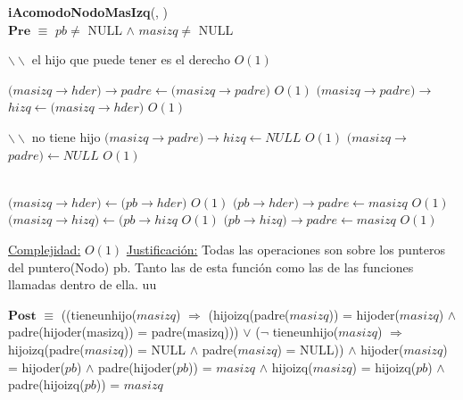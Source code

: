 \begin{algorithm}[H]{\textbf{iAcomodoNodoMasIzq}(, )}
	{\\ $\textbf{Pre}$ $\equiv$ $pb \neq$ NULL $\land$ $masizq \neq$ NULL}
	\begin{algorithmic}[1]

		\State $\backslash\backslash$ el hijo que puede tener es el derecho
		 \Comment $O(1)$

			\State $(masizq$$\rightarrow$$hder)$$\rightarrow$$padre \gets (masizq$$\rightarrow$$padre) $ \Comment $O(1)$
			\State $(masizq$$\rightarrow$$padre)$$\rightarrow$$hizq \gets (masizq$$\rightarrow$$hder) $ \Comment $O(1)$

		\Else
			\State $\backslash\backslash$ no tiene hijo
			\State $(masizq$$\rightarrow$$padre)$$\rightarrow$$hizq \gets NULL$ \Comment $O(1)$
			\State $(masizq$$\rightarrow$$padre) \gets NULL$ \Comment $O(1)$

		\EndIf
		\\

		\State $(masizq$$\rightarrow$$hder) \gets (pb$$\rightarrow$$hder)$ \Comment $O(1)$
		\State $(pb$$\rightarrow$$hder)$$\rightarrow$$padre \gets masizq$ \Comment $O(1)$
		\State $(masizq$$\rightarrow$$hizq) \gets (pb$$\rightarrow$$hizq$ \Comment $O(1)$
		\State $(pb$$\rightarrow$$hizq)$$\rightarrow$$padre \gets masizq$ \Comment $O(1)$

		\medskip
		\Statex \underline{Complejidad:} $O(1)$
		\Statex \underline{Justificación:} Todas las operaciones son sobre los punteros del puntero(Nodo) pb. Tanto las de esta función como las de las funciones llamadas dentro de ella.
uu
    \end{algorithmic}
    {$\textbf{Post}$ $\equiv$ ((tieneunhijo($masizq$) $\Rightarrow$ (hijoizq(padre($masizq$)) = hijoder($masizq$) $\land$ padre(hijoder(masizq)) = padre(masizq))) $\lor$ ($\neg$ tieneunhijo($masizq$) $\Rightarrow$ hijoizq(padre($masizq$)) = NULL $\land$ padre($masizq$) = NULL)) $\land$ hijoder($masizq$) = hijoder($pb$) $\land$ padre(hijoder($pb$)) = $masizq$ $\land$ hijoizq($masizq$) = hijoizq($pb$) $\land$ padre(hijoizq($pb$)) = $masizq$}
\end{algorithm}







